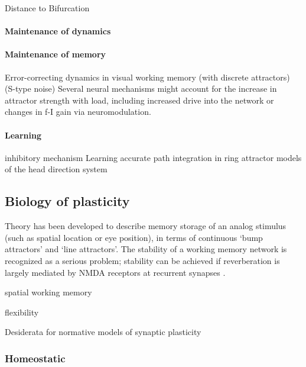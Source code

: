 \documentclass{article}
\theoremstyle{definition} \newtheorem{definition}{Definition}
\theoremstyle{remark} \newtheorem{remark}{Remark}
\newcounter{ct}
\begin{document}
\citep{li2013normally}

Distance to Bifurcation \citep{dobson2003sensitivity}


\paragraph{Maintenance of dynamics}


\paragraph{Maintenance of memory}
Error-correcting dynamics in visual working memory (with discrete attractors) \citep{panichello2019error} (S-type noise)
Several neural mechanisms might account for the increase in attractor strength with load, including increased drive into the network\citep{wang2018flexible} or changes in f-I gain via neuromodulation\citep{servan1990network}.





\paragraph{Learning}
inhibitory mechanism \citep{couey2013recurrent}
Learning accurate path integration in ring attractor models of the head direction system \citep{vafidis2022hd}

\subsection{Biology of plasticity}

Theory has been developed to describe memory storage of an analog stimulus (such as spatial location or eye position), in terms of continuous ‘bump attractors' and ‘line attractors'.
The stability of a working memory network is recognized as a serious problem; stability can be achieved if reverberation is largely mediated by NMDA receptors at recurrent synapses \citep{wang2001synaptic}.

spatial working memory\citep{compte2000synaptic}

flexibility \citep{remington2018flexible}

Desiderata for normative models of synaptic plasticity \citep{bredenberg2024desiderata}

\subsubsection{Homeostatic} \citep{turrigiano2004homeostatic}
\end{document}
